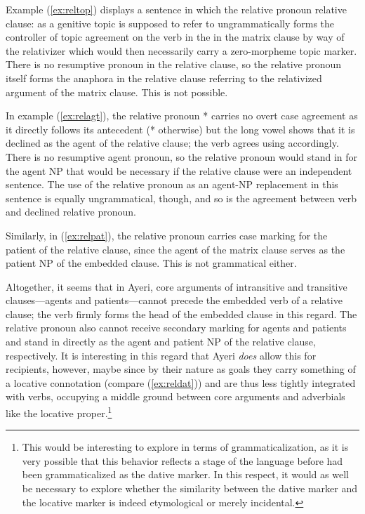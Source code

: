 Example (\ref{ex:reltop}) displays a sentence in which the relative pronoun 
relative clause:  as a genitive topic is supposed to refer to 
ungrammatically forms the controller of topic agreement on the verb in the 
 in the matrix clause by way of the relativizer 
 which would then necessarily carry a zero-morpheme topic 
marker. There is no resumptive pronoun in the relative clause, so the relative 
pronoun itself forms the anaphora in the relative clause referring to the 
relativized argument of the matrix clause. This is not possible.

In example (\ref{ex:relagt}), the relative pronoun * carries
no overt case agreement as it directly follows its antecedent
(* otherwise) but the long vowel shows that it is declined
as the agent of the relative clause; the verb agrees using 
accordingly. There is no resumptive agent pronoun, so the relative pronoun
would stand in for the agent NP that would be necessary if the relative clause
were an independent sentence. The use of the relative pronoun as an agent-NP
replacement in this sentence is equally ungrammatical, though, and so is the
agreement between verb and declined relative pronoun.

Similarly, in (\ref{ex:relpat}), the relative pronoun carries case marking for
the patient of the relative clause, since the agent of the matrix clause serves
as the patient NP of the embedded clause. This is not grammatical either.

Altogether, it seems that in Ayeri, core arguments of intransitive and
transitive clauses---agents and patients---cannot precede the embedded verb of
a relative clause; the verb firmly forms the head of the embedded clause in
this regard. The relative pronoun also cannot receive secondary marking for
agents and patients and stand in directly as the agent and patient NP of the
relative clause, respectively. It is interesting in this regard that Ayeri
\emph{does} allow this for recipients, however, maybe since by their nature as
goals they carry something of a locative connotation (compare
(\ref{ex:reldat})) and are thus less tightly integrated with verbs, occupying a
middle ground between core arguments and adverbials like the locative
proper.\footnote{This would be interesting to explore in terms of
grammaticalization, as it is very possible that this behavior reflects a stage
of the language before  had been grammaticalized as the dative
marker. In this respect, it would as well be necessary to explore whether the
similarity between the dative marker  and the locative marker
 is indeed etymological or merely incidental.}

